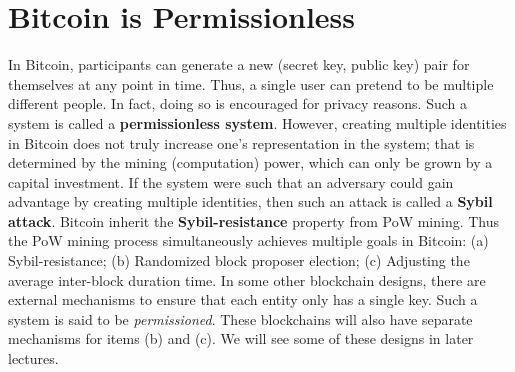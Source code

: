 \documentclass{article}
\begin{document}

\section*{Bitcoin is Permissionless}
In Bitcoin, participants can generate a new (secret key, public key) pair for themselves at any point in time. Thus, a single user can pretend to be multiple different people. In fact, doing so is encouraged for privacy reasons. Such a system is called a \textbf{permissionless system}. However, creating multiple identities in Bitcoin does not truly increase one's representation in the system; that is determined by the mining (computation) power, which can only be grown by a capital investment. If the system were such that an adversary could gain advantage by creating multiple identities, then such an attack is called a \textbf{Sybil attack}.  Bitcoin inherit the    \textbf{Sybil-resistance} property from PoW mining. Thus the PoW mining process simultaneously achieves multiple goals in  Bitcoin: (a) Sybil-resistance; (b) Randomized block proposer election; (c) Adjusting the average inter-block duration time.  
In some other blockchain designs, there are external mechanisms to ensure that each entity only has a single key. Such a system is said to be {\em permissioned}. These blockchains will also have separate mechanisms for items (b) and (c). We will see some of these designs in later lectures. 







\end{document}
